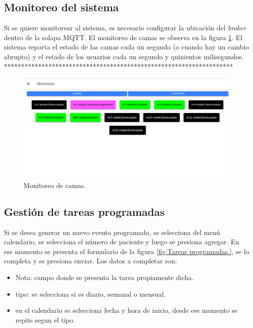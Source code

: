 \subsection{Monitoreo del sistema}
Si se quiere monitorear al sistema, es necesario configurar la ubicación del \textit{broker} dentro de la solapa MQTT. El monitoreo de camas se observa en la figura \ref{fig:Monitoreo de camas.}. El sistema reporta el estado de las camas cada un segundo (o cuando hay un cambio abrupto) y el estado de los usuarios cada un segundo y quinientos milisegundos.
*******************************************************************
\begin{figure}[ht]
	\centering
	\includegraphics[scale=.40]{./Figures/monitoreo-camas.png}
	\caption{Monitoreo de camas.}
	\label{fig:Monitoreo de camas.}
\end{figure} 

\subsection{Gestión de tareas programadas}

Si se desea generar un nuevo evento programado, se selecciona del menú  calendario, se selecciona el número de paciente y luego se presiona agregar. En ese momento se presenta el formulario de la figura \ref{fig:Tareas programadas.}, se lo completa y se presiona enviar. Los datos a completar son:
\begin{itemize}
\item Nota: campo donde se presenta la tarea propiamente dicha.
\item tipo: se selecciona si es diario, semanal o mensual.
\item en el calendario se selecciona fecha y hora de inicio, desde ese momento se repite segun el tipo.
\end{itemize}

